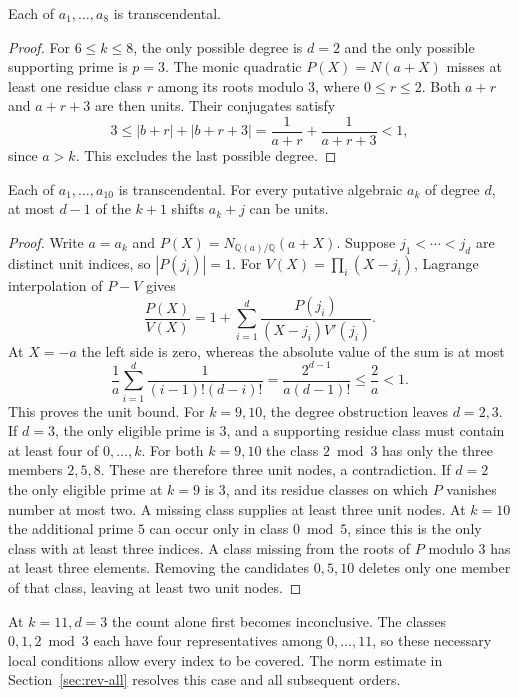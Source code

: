 \documentclass[11pt,a4paper]{article}
\theoremstyle{definition}\newtheorem{definition}[theorem]{Definition}\newtheorem{example}[theorem]{Example}
\theoremstyle{remark}\newtheorem{remark}[theorem]{Remark}
\newcommand{\Q}{\mathbb Q}\newcommand{\Z}{\mathbb Z}\newcommand{\R}{\mathbb R}\newcommand{\N}{\mathbb N}
\begin{document}
\begin{corollary}\label{cor:eight-zeros}
Each of $a_1,\ldots,a_8$ is transcendental.
\end{corollary}
\begin{proof}
For $6\le k\le8$, the only possible degree is $d=2$ and the only possible supporting prime is $p=3$. The monic quadratic $P(X)=N(a+X)$ misses at least one residue class $r$ among its roots modulo $3$, where $0\le r\le2$. Both $a+r$ and $a+r+3$ are then units. Their conjugates satisfy
\[
 3\le |b+r|+|b+r+3|=\frac1{a+r}+\frac1{a+r+3}<1,
\]
since $a>k$. This excludes the last possible degree.
\end{proof}
\begin{corollary}\label{cor:ten-zeros}
Each of $a_1,\ldots,a_{10}$ is transcendental. For every putative algebraic $a_k$ of degree $d$, at most $d-1$ of the $k+1$ shifts $a_k+j$ can be units.
\end{corollary}
\begin{proof}
Write $a=a_k$ and $P(X)=N_{\Q(a)/\Q}(a+X)$. Suppose $j_1<\cdots<j_d$ are distinct unit indices, so $|P(j_i)|=1$. For $V(X)=\prod_i(X-j_i)$, Lagrange interpolation of $P-V$ gives
\[
 \frac{P(X)}{V(X)}=1+\sum_{i=1}^d\frac{P(j_i)}{(X-j_i)V'(j_i)}.
\]
At $X=-a$ the left side is zero, whereas the absolute value of the sum is at most
\[
 \frac1a\sum_{i=1}^d\frac1{(i-1)!(d-i)!}
 =\frac{2^{d-1}}{a(d-1)!}\le\frac2a<1.
\]
This proves the unit bound. For $k=9,10$, the degree obstruction leaves $d=2,3$. If $d=3$, the only eligible prime is $3$, and a supporting residue class must contain at least four of $0,\ldots,k$. For both $k=9,10$ the class $2\bmod3$ has only the three members $2,5,8$. These are therefore three unit nodes, a contradiction. If $d=2$ the only eligible prime at $k=9$ is $3$, and its residue classes on which $P$ vanishes number at most two. A missing class supplies at least three unit nodes. At $k=10$ the additional prime $5$ can occur only in class $0\bmod5$, since this is the only class with at least three indices. A class missing from the roots of $P$ modulo $3$ has at least three elements. Removing the candidates $0,5,10$ deletes only one member of that class, leaving at least two unit nodes.\end{proof}
At $k=11,d=3$ the count alone first becomes inconclusive. The classes $0,1,2\bmod3$ each have four representatives among $0,\ldots,11$, so these necessary local conditions allow every index to be covered. The norm estimate in Section~\ref{sec:rev-all} resolves this case and all subsequent orders.
\end{document}
